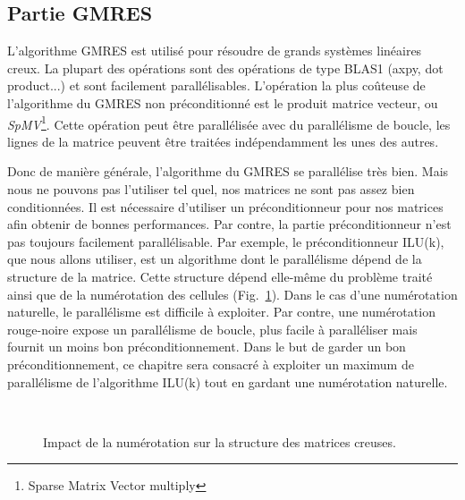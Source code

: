 \subsection{Partie GMRES}
L'algorithme GMRES est utilisé pour résoudre de grands systèmes linéaires creux.
%
La plupart des opérations sont des opérations de type BLAS1 (axpy, dot product...) et sont facilement parallélisables\cite{para_blas}.
%
L'opération la plus coûteuse de l'algorithme du GMRES non préconditionné est le produit matrice vecteur, ou {\em SpMV}\footnote{Sparse Matrix Vector multiply}.
%
Cette opération peut être parallélisée avec du parallélisme de boucle, les lignes de la matrice peuvent être traitées indépendamment les unes des autres\cite{para_spmv}.


Donc de manière générale, l'algorithme du GMRES se parallélise très bien.
%
Mais nous ne pouvons pas l'utiliser tel quel, nos matrices ne sont pas assez bien conditionnées.
%
Il est nécessaire d'utiliser un préconditionneur pour nos matrices afin obtenir de bonnes performances.
%
Par contre, la partie préconditionneur n'est pas toujours facilement parallélisable.
%
Par exemple, le préconditionneur ILU(k), que nous allons utiliser, est un algorithme dont le parallélisme dépend de la structure de la matrice.
%
Cette structure dépend elle-même du problème traité ainsi que de la numérotation des cellules (Fig.~\ref{fig:matrix_ordering}).
%
Dans le cas d'une numérotation naturelle, le parallélisme est difficile à exploiter.
%
Par contre, une numérotation rouge-noire expose un parallélisme de boucle, plus facile à paralléliser mais fournit un moins bon préconditionnement\cite{red_black_ilu2}.
%
Dans le but de garder un bon préconditionnement, ce chapitre sera consacré à exploiter un maximum de parallélisme de l'algorithme ILU(k) tout en gardant une numérotation naturelle.

\begin{figure}[!ht]
     \begin{center}
        \\%
    \end{center}
    \caption{Impact de la numérotation sur la structure des matrices creuses.}
    \label{fig:matrix_ordering}
\end{figure}



